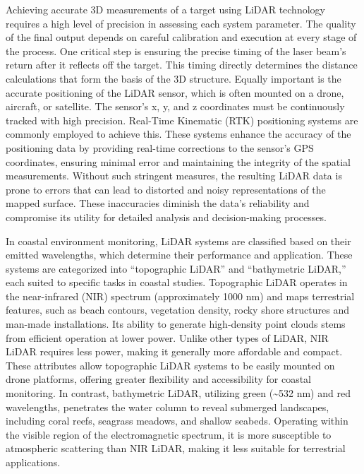 \documentclass[
  letterpaper,
  11pt,
  english,
  singlespacing,
  headsepline]{MastersDoctoralThesis}
\begin{document}
\begin{spacing}{1.5}
Achieving accurate 3D measurements of a target using LiDAR technology
requires a high level of precision in assessing each system parameter.
The quality of the final output depends on careful calibration and
execution at every stage of the process. One critical step is ensuring
the precise timing of the laser beam's return after it reflects off the
target. This timing directly determines the distance calculations that
form the basis of the 3D structure. Equally important is the accurate
positioning of the LiDAR sensor, which is often mounted on a drone,
aircraft, or satellite. The sensor's x, y, and z coordinates must be
continuously tracked with high precision. Real-Time Kinematic (RTK)
positioning systems are commonly employed to achieve this. These systems
enhance the accuracy of the positioning data by providing real-time
corrections to the sensor's GPS coordinates, ensuring minimal error and
maintaining the integrity of the spatial measurements. Without such
stringent measures, the resulting LiDAR data is prone to errors that can
lead to distorted and noisy representations of the mapped surface. These
inaccuracies diminish the data's reliability and compromise its utility
for detailed analysis and decision-making processes.

In coastal environment monitoring, LiDAR systems are classified based on
their emitted wavelengths, which determine their performance and
application. These systems are categorized into ``topographic LiDAR''
and ``bathymetric LiDAR,'' each suited to specific tasks in coastal
studies. Topographic LiDAR operates in the near-infrared (NIR) spectrum
(approximately 1000 nm) and maps terrestrial features, such as beach
contours, vegetation density, rocky shore structures and man-made
installations. Its ability to generate high-density point clouds stems
from efficient operation at lower power. Unlike other types of LiDAR,
NIR LiDAR requires less power, making it generally more affordable and
compact. These attributes allow topographic LiDAR systems to be easily
mounted on drone platforms, offering greater flexibility and
accessibility for coastal monitoring. In contrast, bathymetric LiDAR,
utilizing green (\textasciitilde532 nm) and red wavelengths, penetrates
the water column to reveal submerged landscapes, including coral reefs,
seagrass meadows, and shallow seabeds. Operating within the visible
region of the electromagnetic spectrum, it is more susceptible to
atmospheric scattering than NIR LiDAR, making it less suitable for
terrestrial applications.


\end{spacing}
\end{document}
